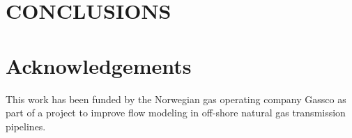 \documentclass{mekit17}
\begin{document}
\section{CONCLUSIONS}
\label{conclusion}


\section*{Acknowledgements}
This work has been funded by the Norwegian gas operating company Gassco as part of a project to improve flow modeling in off-shore natural gas transmission pipelines. 

\printbibliography
\end{document}
